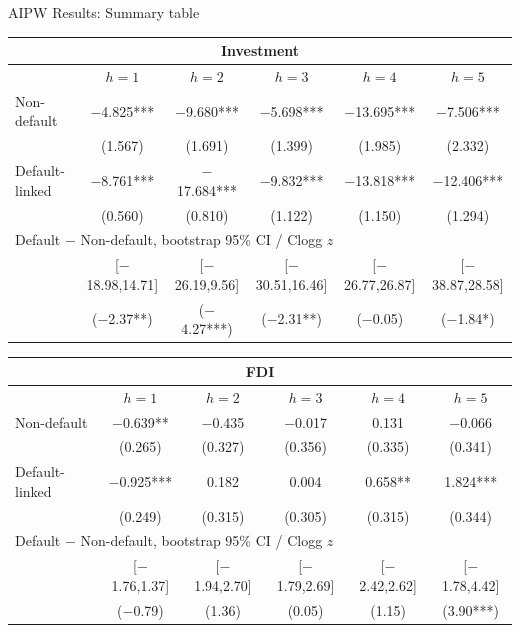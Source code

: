 \documentclass[aspectratio=169]{beamer}
\begin{document}
\begin{frame}{AIPW Results: Summary table}
  \tiny
  \begin{center}
  \renewcommand{\arraystretch}{1.0}
  \begin{tabular*}{0.92\linewidth}{@{\extracolsep{\fill}}lccccc}
  \multicolumn{6}{c}{\normalsize Investment} \\
  \toprule
   & $h=1$ & $h=2$ & $h=3$ & $h=4$ & $h=5$ \\
  \midrule
  Non-default & $-$4.825*** & $-$9.680*** & $-$5.698*** & $-$13.695*** & $-$7.506*** \\
   & (1.567) & (1.691) & (1.399) & (1.985) & (2.332) \\[1pt]
  Default-linked & $-$8.761*** & $-$17.684*** & $-$9.832*** & $-$13.818*** & $-$12.406*** \\
   & (0.560) & (0.810) & (1.122) & (1.150) & (1.294) \\
  \midrule
  \multicolumn{6}{l}{Default $-$ Non-default, bootstrap 95\% CI / Clogg $z$} \\
  & [$-$18.98,14.71] & [$-$26.19,9.56] & [$-$30.51,16.46] & [$-$26.77,26.87] & [$-$38.87,28.58] \\
  & ($-$2.37**) & ($-$4.27***) & ($-$2.31**) & ($-$0.05) & ($-$1.84*) \\
  \bottomrule
  \end{tabular*}
  \vspace{0.5em}
  \begin{tabular*}{0.92\linewidth}{@{\extracolsep{\fill}}lccccc}
  \multicolumn{6}{c}{\normalsize FDI} \\
  \toprule
   & $h=1$ & $h=2$ & $h=3$ & $h=4$ & $h=5$ \\
  \midrule
  Non-default & $-$0.639** & $-$0.435 & $-$0.017 & 0.131 & $-$0.066 \\
   & (0.265) & (0.327) & (0.356) & (0.335) & (0.341) \\[1pt]
  Default-linked & $-$0.925*** & 0.182 & 0.004 & 0.658** & 1.824*** \\
   & (0.249) & (0.315) & (0.305) & (0.315) & (0.344) \\
  \midrule
  \multicolumn{6}{l}{Default $-$ Non-default, bootstrap 95\% CI / Clogg $z$} \\
  & [$-$1.76,1.37] & [$-$1.94,2.70] & [$-$1.79,2.69] & [$-$2.42,2.62] & [$-$1.78,4.42] \\
  & ($-$0.79) & (1.36) & (0.05) & (1.15) & (3.90***) \\
  \bottomrule
  \end{tabular*}
  \end{center}
\end{frame}
\end{document}
